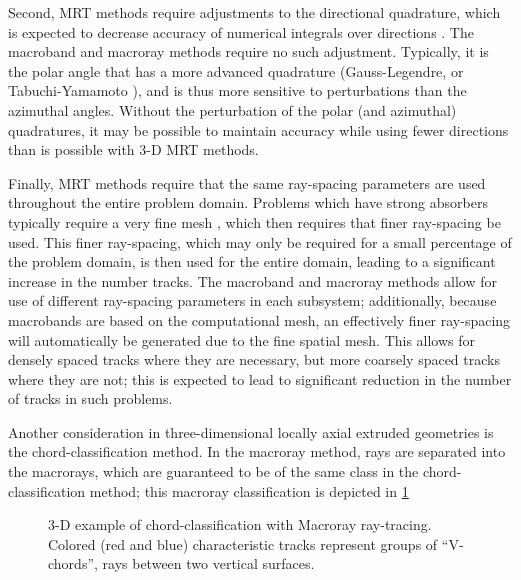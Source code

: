 {{{            Second, \ac{MRT} methods require adjustments to the directional quadrature, which is expected to decrease accuracy of numerical integrals over directions \cite{Kochunas2013}.
            The macroband and macroray methods require no such adjustment.
            Typically, it is the polar angle that has a more advanced quadrature (Gauss-Legendre, or Tabuchi-Yamamoto \cite{TabuchiYamamotoQuad}), and is thus more sensitive to perturbations than the azimuthal angles.
            Without the perturbation of the polar (and azimuthal) quadratures, it may be possible to maintain accuracy while using fewer directions than is possible with 3-D \ac{MRT} methods.

            Finally, \ac{MRT} methods require that the same ray-spacing parameters are used throughout the entire problem domain.
            Problems which have strong absorbers typically require a very fine mesh \cite{Fitzgerald2019}, which then requires that finer ray-spacing be used.
            This finer ray-spacing, which may only be required for a small percentage of the problem domain, is then used for the entire domain, leading to a significant increase in the number tracks.
            The macroband and macroray methods allow for use of different ray-spacing parameters in each subsystem; additionally, because macrobands are based on the computational mesh, an effectively finer ray-spacing will automatically be generated due to the fine spatial mesh.
            This allows for densely spaced tracks where they are necessary, but more coarsely spaced tracks where they are not; this is expected to lead to significant reduction in the number of tracks in such problems.

            Another consideration in three-dimensional locally axial extruded geometries is the chord-classification method.
            In the macroray method, rays are separated into the macrorays, which are guaranteed to be of the same class in the chord-classification method;
            this macroray classification is depicted in \cref{fig:RT:Chord-Classification Macroray}

            \begin{figure}[h]
                \centering
                \def\svgwidth{0.45\linewidth}
                
                \caption{3-D example of chord-classification with Macroray ray-tracing. Colored (red and blue) characteristic tracks represent groups of ``V-chords'', rays between two vertical surfaces.}
                \label{fig:RT:Chord-Classification Macroray}
            \end{figure}
        }
}}
